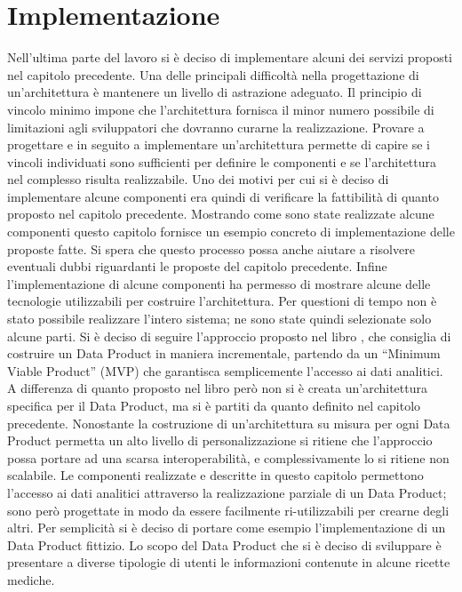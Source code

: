 \documentclass[12pt]{report}
\begin{document}
\chapter{Implementazione}
Nell'ultima parte del lavoro si è deciso di implementare alcuni dei servizi proposti nel capitolo precedente.
Una delle principali difficoltà nella progettazione di un'architettura è mantenere un livello di astrazione adeguato.
Il principio di vincolo minimo impone che l'architettura fornisca il minor numero possibile di limitazioni agli sviluppatori che dovranno curarne la realizzazione.
Provare a progettare e in seguito a implementare un'architettura permette di capire se i vincoli individuati sono sufficienti per definire le componenti e se l'architettura nel complesso risulta realizzabile.
Uno dei motivi per cui si è deciso di implementare alcune componenti era quindi di verificare la fattibilità di quanto proposto nel capitolo precedente.
Mostrando come sono state realizzate alcune componenti questo capitolo fornisce un esempio concreto di implementazione delle proposte fatte.
Si spera che questo processo possa anche aiutare a risolvere eventuali dubbi riguardanti le proposte del capitolo precedente.
Infine l'implementazione di alcune componenti ha permesso di mostrare alcune delle tecnologie utilizzabili per costruire l'architettura. 
Per questioni di tempo non è stato possibile realizzare l'intero sistema; ne sono state quindi selezionate solo alcune parti.
Si è deciso di seguire l'approccio proposto nel libro \cite{data_mesh_in_action}, che consiglia di costruire un Data Product in maniera incrementale, partendo da un ``Minimum Viable Product'' (MVP) che garantisca semplicemente l'accesso ai dati analitici.
A differenza di quanto proposto nel libro però non si è creata un'architettura specifica per il Data Product, ma si è partiti da quanto definito nel capitolo precedente.
Nonostante la costruzione di un'architettura su misura per ogni Data Product permetta un alto livello di personalizzazione si ritiene che l'approccio possa portare ad una scarsa interoperabilità, e complessivamente lo si ritiene non scalabile.
Le componenti realizzate e descritte in questo capitolo permettono l'accesso ai dati analitici attraverso la realizzazione parziale di un Data Product; sono però progettate in modo da essere facilmente ri-utilizzabili per crearne degli altri. 
Per semplicità si è deciso di portare come esempio l'implementazione di un Data Product fittizio.
Lo scopo del Data Product che si è deciso di sviluppare è presentare a diverse tipologie di utenti le informazioni contenute in alcune ricette mediche.
\end{document}
